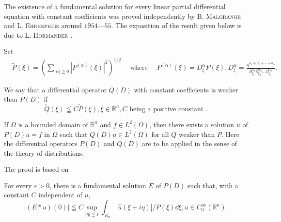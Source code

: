 The existence of a fundamental solution for every linear partial differential equation with constant coefficients was proved independently by B. \textsc{Malgrange} \cite{malgrange186} and L. \textsc{Ehrenpreis} \cite{ehrenpreis53} around $1954$---$55$. The exposition of the result given below is due to L. \textsc{Hörmander} \cite{hormander116}. 

\begin{definition}\label{def:VI.10.Definition.2} Set 
\begin{equation}\label{eq:VI.10.1}
\begin{aligned}
&\tilde {P} (\xi) = \left(\sum\limits_{| \alpha | \geqq 0} | P ^{(\alpha)} (\xi) | ^{2}\right) ^{1/2} \quad \text{ where } \quad P ^{(\alpha)} (\xi) = D _{\xi} ^{\alpha} P (\xi), D _{\xi} ^{\alpha} = \frac {\partial^ {\alpha_{1} + \alpha_{2} + \cdots + \alpha_{n}}}{\partial_ {\xi_{1}} ^ {\alpha_{1}} \partial_ {\xi_{2}} ^ {\alpha_{2}} \ldots \partial_ {\xi_{n}} ^ {\alpha_{n}}}.
\end{aligned}
\end{equation}
\end{definition}

We say that a differential operator $Q(D)$ with constant coefficients is weaker than $P(D)$ if 
\begin{equation}\label{eq:VI.10.2}
\tilde {Q} (\xi) \leqq C \tilde {P} (\xi), \xi \in \mathbb{R}^{n}, C \text{ being a positive constant }.
\end{equation}

\begin{theorem}\label{thm:VI.10.Theorem.1} If $\Omega$ is a bounded domain of $\mathbb{R}^{n}$ and $f \in L^2(\Omega)$, then there exists a solution $u$ of $P(D) u = f$ in $\Omega$ such that $Q(D) u \in L^2(\Omega)$ for all $Q$ weaker than $P$. Here the differential operators $P(D)$ and $Q(D)$ are to be applied in the sense of the theory of distributions. 
\end{theorem}

The proof is based on 

\begin{theorem}\label{thm:VI.10.Theorem.2} For every $\varepsilon > 0$, there is a fundamental solution $E$ of $P(D)$ such that, with a constant $C$ independent of $u$, 
\begin{equation}\label{eq:VI.10.3}
\left| (E * u) (0) \right| \leqq C \sup\limits _{| \eta | \leqq \varepsilon} \int_ {R _{n}} \left| \hat {u} (\xi + i \eta) \right| / \tilde {P} (\xi) \dd \xi , u \in C _{0} ^{\infty} (\mathbb{R}^{n}).
\end{equation}
\end{theorem}

